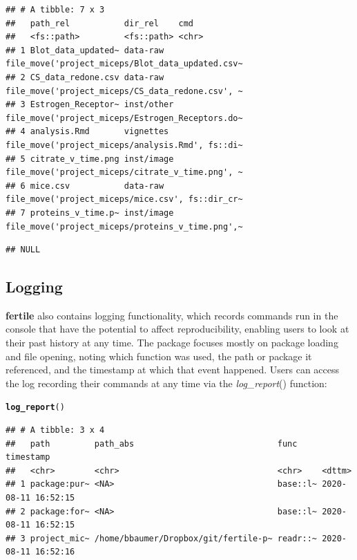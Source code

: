\documentclass[APA,LATO1COL]{WileyNJD-v2}\usepackage[]{graphicx}\usepackage[]{color}
\makeatletter
\newcommand{\hlstd}[1]{\textcolor[rgb]{0.345,0.345,0.345}{#1}}%
\newcommand{\hlkwd}[1]{\textcolor[rgb]{0.737,0.353,0.396}{\textbf{#1}}}%
\newenvironment{kframe}{%
 \def\at@end@of@kframe{}%
 \ifinner\ifhmode%
  \def\at@end@of@kframe{\end{minipage}}%
  \begin{minipage}{\columnwidth}%
 \fi\fi%
 \def\FrameCommand##1{\hskip\@totalleftmargin \hskip-\fboxsep
 \colorbox{shadecolor}{##1}\hskip-\fboxsep
     \hskip-\linewidth \hskip-\@totalleftmargin \hskip\columnwidth}%
 \MakeFramed {\advance\hsize-\width
   \@totalleftmargin\z@ \linewidth\hsize
   \@setminipage}}%
 {\par\unskip\endMakeFramed%
 \at@end@of@kframe}
\newenvironment{knitrout}{}{} %
\newcommand{\pkg}[1]{\textbf{#1}}
\newcommand{\func}[1]{\textit{#1}()}
\makeatother
\begin{document}
\begin{knitrout}
\begin{kframe}
{\ttfamily\noindent\itshape\color{messagecolor}{\#\# --\ \  Suggestions for moving files --------------------------------------------------------- fertile 0.0.0.9027 --}}\begin{verbatim}
## # A tibble: 7 x 3
##   path_rel           dir_rel    cmd                                             
##   <fs::path>         <fs::path> <chr>                                           
## 1 Blot_data_updated~ data-raw   file_move('project_miceps/Blot_data_updated.csv~
## 2 CS_data_redone.csv data-raw   file_move('project_miceps/CS_data_redone.csv', ~
## 3 Estrogen_Receptor~ inst/other file_move('project_miceps/Estrogen_Receptors.do~
## 4 analysis.Rmd       vignettes  file_move('project_miceps/analysis.Rmd', fs::di~
## 5 citrate_v_time.png inst/image file_move('project_miceps/citrate_v_time.png', ~
## 6 mice.csv           data-raw   file_move('project_miceps/mice.csv', fs::dir_cr~
## 7 proteins_v_time.p~ inst/image file_move('project_miceps/proteins_v_time.png',~
\end{verbatim}


{\ttfamily\noindent\itshape\color{messagecolor}{\#\# --\ \  Problematic paths logged ------------------------------------------------------------- fertile 0.0.0.9027 --}}\begin{verbatim}
## NULL
\end{verbatim}
\end{kframe}
\end{knitrout}

\subsection{Logging}

\pkg{fertile} also contains logging functionality, which records commands run in the console that have the potential to affect reproducibility, enabling users to look at their past history at any time. The package focuses mostly on package loading and file opening, noting which function was used, the path or package it referenced, and the timestamp at which that event happened. Users can access the log recording their commands at any time via the \func{log\_report} function:



\begin{knitrout}
\color{fgcolor}\begin{kframe}
\begin{alltt}
\hlkwd{log_report}\hlstd{()}
\end{alltt}
\begin{verbatim}
## # A tibble: 3 x 4
##   path         path_abs                             func     timestamp          
##   <chr>        <chr>                                <chr>    <dttm>             
## 1 package:pur~ <NA>                                 base::l~ 2020-08-11 16:52:15
## 2 package:for~ <NA>                                 base::l~ 2020-08-11 16:52:15
## 3 project_mic~ /home/bbaumer/Dropbox/git/fertile-p~ readr::~ 2020-08-11 16:52:16
\end{verbatim}
\end{kframe}
\end{knitrout}
\end{document}
